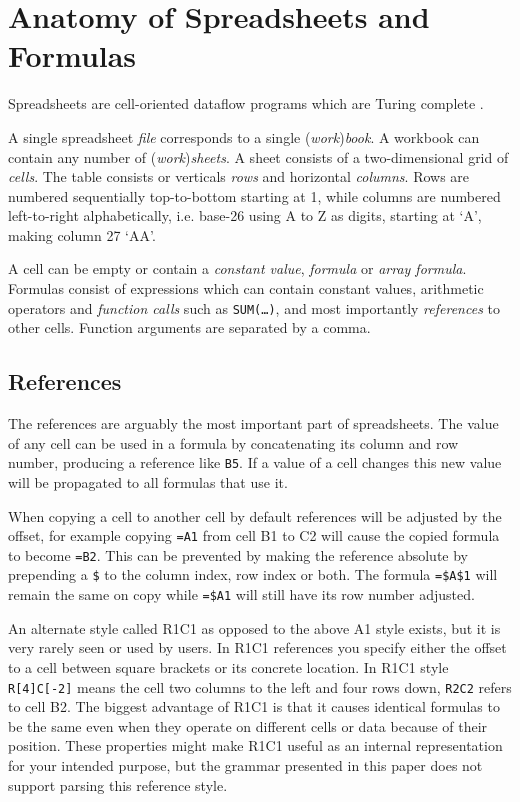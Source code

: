 \documentclass[conference]{IEEEtran}
\begin{document}
\section{Anatomy of Spreadsheets and Formulas}

Spreadsheets are cell-oriented dataflow programs which are Turing complete \cite{ExcelTuringComplete}.

A single spreadsheet \emph{file} corresponds to a single (\emph{work})\emph{book}.
A workbook can contain any number of (\emph{work})\emph{sheets}.
A sheet consists of a two-dimensional grid of \emph{cells}.
The table consists or verticals \emph{rows} and horizontal \emph{columns}.
Rows are numbered sequentially top-to-bottom starting at 1, while columns are numbered left-to-right alphabetically, i.e. base-26 using A to Z as digits, starting at `A', making column 27 `AA'.

A cell can be empty or contain a \emph{constant value}, \emph{formula} or \emph{array formula}.
Formulas consist of expressions which can contain constant values, arithmetic operators and \emph{function calls} such as \texttt{SUM(\ldots)}, and most importantly \emph{references} to other cells.
Function arguments are separated by a comma.

\subsection{References}
The references are arguably the most important part of spreadsheets.
The value of any cell can be used in a formula by concatenating its column and row number, producing a reference like \texttt{B5}.
If a value of a cell changes this new value will be propagated to all formulas that use it.

When copying a cell to another cell by default references will be adjusted by the offset, for example copying \texttt{=A1} from cell B1 to C2 will cause the copied formula to become \texttt{=B2}.
This can be prevented by making the reference absolute by prepending a \texttt{\$} to the column index, row index or both.
The formula \texttt{=\$A\$1} will remain the same on copy while \texttt{=\$A1} will still have its row number adjusted.

An alternate style called R1C1 as opposed to the above A1 style exists, but it is very rarely seen or used by users.
In R1C1 references you specify either the offset to a cell between square brackets or its concrete location.
In R1C1 style \texttt{R[4]C[-2]} means the cell two columns to the left and four rows down, \texttt{R2C2} refers to cell B2.
The biggest advantage of R1C1 is that it causes identical formulas to be the same even when they operate on different cells or data because of their position.
These properties might make R1C1 useful as an internal representation for your intended purpose, but the grammar presented in this paper does not support parsing this reference style.
\end{document}

